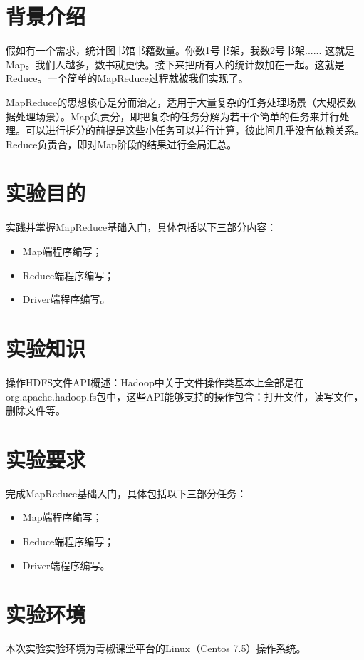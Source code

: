 \documentclass {article}
\begin{document}
	\maketitle{}
	\section{背景介绍}
		假如有一个需求，统计图书馆书籍数量。你数1号书架，我数2号书架...... 这就是Map。我们人越多，数书就更快。接下来把所有人的统计数加在一起。这就是Reduce。一个简单的MapReduce过程就被我们实现了。
		
		MapReduce的思想核心是分而治之，适用于大量复杂的任务处理场景（大规模数据处理场景）。Map负责分，即把复杂的任务分解为若干个简单的任务来并行处理。可以进行拆分的前提是这些小任务可以并行计算，彼此间几乎没有依赖关系。Reduce负责合，即对Map阶段的结果进行全局汇总。
	
	\section{实验目的}
		实践并掌握MapReduce基础入门，具体包括以下三部分内容：
		\begin{itemize}
			\item Map端程序编写；
			\item Reduce端程序编写；
			\item Driver端程序编写。
		\end{itemize}
	
	\section{实验知识}	
		操作HDFS文件API概述：Hadoop中关于文件操作类基本上全部是在org.apache.hadoop.fs包中，这些API能够支持的操作包含：打开文件，读写文件，删除文件等。
	
	\section{实验要求}
		完成MapReduce基础入门，具体包括以下三部分任务：
		\begin{itemize}
			\item Map端程序编写；
			\item Reduce端程序编写；
			\item Driver端程序编写。
		\end{itemize}
	
	\section{实验环境}
		本次实验实验环境为青椒课堂平台的Linux（Centos 7.5）操作系统。
	
\end{document}
